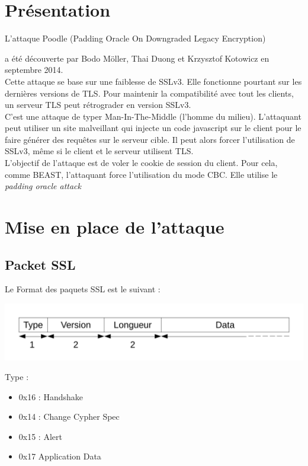 
\chapter{Présentation}
\label{chapter:poodlePres}

L'attaque Poodle (Padding Oracle On Downgraded Legacy Encryption)

a été découverte par Bodo Möller, Thai Duong et 
Krzysztof Kotowicz\cite{article:ssl-poodle} en septembre 2014.\\

Cette attaque se base sur une faiblesse de SSLv3.
Elle fonctionne pourtant sur les dernières versions de TLS.
Pour maintenir la compatibilité avec tout les clients, un
serveur TLS peut rétrograder en version SSLv3.\\

C'est une attaque de typer Man-In-The-Middle (l'homme du milieu).
L'attaquant peut utiliser un site malveillant qui injecte un
code javascript sur le client pour le faire générer des requêtes
sur le serveur cible. Il peut alors forcer l'utilisation de 
SSLv3, même si le client et le serveur utilisent TLS.\\

L'objectif de l'attaque est de voler le cookie de session 
du client. Pour cela, comme BEAST, l'attaquant force 
l'utilisation du mode CBC. Elle utilise le \emph{padding oracle attack }

\chapter{Mise en place de l'attaque}
\label{chapter:Poodleattack}

\section{Packet SSL}
\label{sec:packet}

Le Format des paquets SSL est le suivant : 
\begin{center}
\includegraphics[scale=0.5]{schemaSSL.pdf}
\end{center}

Type :
\begin{itemize}
\item 0x16 : Handshake
\item 0x14 : Change Cypher Spec
\item 0x15 : Alert
\item 0x17 Application Data
\end{itemize}

